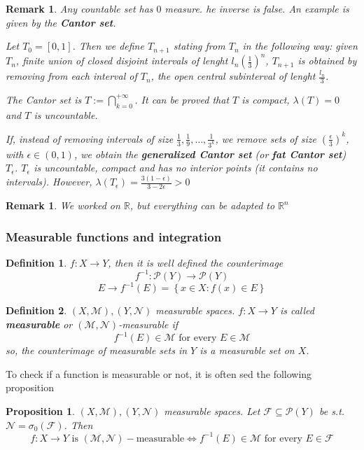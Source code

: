 \documentclass[a4paper,12pt]{article}
\theoremstyle{break}
\newtheorem{proposition}{Proposition}[section]
\newtheorem{remark}[section]{Remark}
\newtheorem{definition}{Definition}[section]
\newcommand{\real}{\mathbb{R}}
\numberwithin{equation}{section}
\begin{document}
\begin{remark}
    Any countable set has \(0\) measure. he inverse is false. An example is given by the \textbf{Cantor set}.
    
    Let \(T_0 = [0,1]\). Then we define \(T_{n+1}\) stating from \(T_n\) in the following way:
    given \(T_n\), finite union of closed disjoint intervals of lenght \(l_n (\frac{1}{3})^n\), \(T_{n+1}\) is obtained by removing from each interval of \(T_n\), the open central subinterval of lenght \(\frac{l_n}{3}\).

    The Cantor set is \(T := \bigcap_{k=0}^{+\infty}\). It can be proved that \(T\) is compact, \(\lambda(T) = 0\) and \(T\) is uncountable.

    If, instead of removing intervals of size \(\frac{1}{3}, \frac{1}{9}, \ldots, \frac{1}{3^k}\), we remove sets of size \(\left(\frac{\epsilon}{3}\right)^k\), with \(\epsilon \in (0,1)\), we obtain the \textbf{generalized Cantor set} (or \textbf{fat Cantor set}) \(T_{\epsilon}\). \(T_{\epsilon}\) is uncountable, compact and has no interior points (it contains no intervals). However, \(\lambda(T_{\epsilon}) = \frac{3(1 -\epsilon)}{3 - 2\epsilon} > 0\)
\end{remark}
\begin{remark}
    We worked on \(\real\), but everything can be adapted to \(\real^n\)
\end{remark}
\subsubsection*{Measurable functions and integration}
\begin{definition}
    \(f:X \to Y\), then it is well defined the counterimage 
    \[
        f^{-1} : \mathcal{P}(Y) \to \mathcal{P}(Y)
    \]
    \[
        E \to f^{-1}(E) = \left\{ x \in X : f(x) \in E \right\}
    \]
\end{definition}
\begin{definition}
    \((X, \mathcal{M}), (Y, \mathcal{N})\) measurable spaces. \(f:X \to Y\) is called \textbf{measurable} or \((\mathcal{M}, \mathcal{N})\)-measurable if 
    \[
        f^{-1}(E) \in \mathcal{M} \mbox{ for every } E \in \mathcal{M}
    \]
    so, the counterimage of measurable sets in \(Y\) is a measurable set on \(X\).
\end{definition}
To check if a function is measurable or not, it is often sed the following proposition
\begin{proposition}
    \((X, \mathcal{M}), (Y, \mathcal{N})\) measurable spaces. Let \(\mathcal{F} \subseteq \mathcal{P}(Y)\) be s.t. \(\mathcal{N} = \sigma_0(\mathcal{F})\). Then
    \[
        f: X \to Y \mbox{ is } (\mathcal{M}, \mathcal{N})-\mbox{measurable} \Longleftrightarrow f^{-1}(E) \in \mathcal{M} \mbox{ for every } E \in \mathcal{F}
    \]
\end{proposition}
\end{document}
